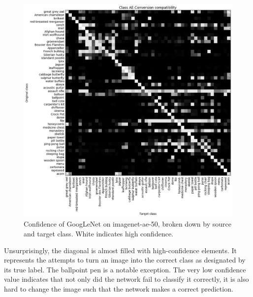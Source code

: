 \documentclass[11pt, a4paper]{article}
\begin{document}
\begin{figure}[h!tb]
	\centering
	\includegraphics[width=\textwidth]{images/confusion-matrices/imagenet-ae-50.png}
	\caption[Confidence of GoogLeNet on ImageNet, by source and target class.]{Confidence of GoogLeNet on imagenet-ae-50, broken down by source and target class. White indicates high confidence.}
	\label{fig:imagenet-ae-50-confusion-matrix}
\end{figure}

Unsurprisingly, the diagonal is almost filled with high-confidence elements. It represents the attempts to turn an image into the correct class as designated by its true label. The ballpoint pen is a notable exception. The very low confidence value indicates that not only did the network fail to classify it correctly, it is also hard to change the image such that the network makes a correct prediction.
\end{document}

